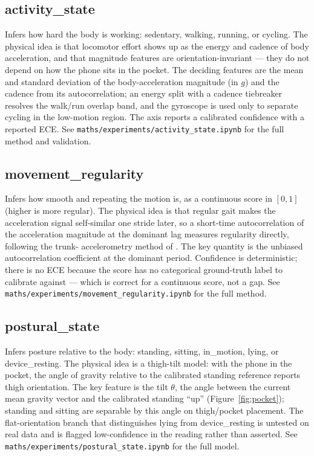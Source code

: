\documentclass[11pt]{article}
\newcommand{\nb}[1]{\texttt{#1}}            %
\begin{document}
\subsection{activity\_state}
Infers how hard the body is working: sedentary, walking, running, or cycling. The
physical idea is that locomotor effort shows up as the energy and cadence of body
acceleration, and that magnitude features are orientation-invariant --- they do not
depend on how the phone sits in the pocket. The deciding features are the mean and
standard deviation of the body-acceleration magnitude (in $g$) and the cadence from its
autocorrelation; an energy split with a cadence tiebreaker resolves the walk/run
overlap band, and the gyroscope is used only to separate cycling in the low-motion
region. The axis reports a calibrated confidence with a reported ECE. See
\nb{maths/experiments/activity\_state.ipynb} for the full method and validation.

\subsection{movement\_regularity}
Infers how smooth and repeating the motion is, as a continuous score in $[0,1]$ (higher
is more regular). The physical idea is that regular gait makes the acceleration signal
self-similar one stride later, so a short-time autocorrelation of the acceleration
magnitude at the dominant lag measures regularity directly, following the trunk-
accelerometry method of \citet{moenilssen2004gait}.
The key quantity is the unbiased autocorrelation coefficient at the dominant period.
Confidence is deterministic; there is no ECE because the score has no categorical
ground-truth label to calibrate against --- which is correct for a continuous score, not
a gap. See \nb{maths/experiments/movement\_regularity.ipynb} for the full method.

\subsection{postural\_state}
Infers posture relative to the body: standing, sitting, in\_motion, lying, or
device\_resting. The physical idea is a thigh-tilt model: with the phone in the pocket,
the angle of gravity relative to the calibrated standing reference reports thigh
orientation. The key feature is the tilt $\theta$, the angle between the current mean
gravity vector and the calibrated standing ``up'' (Figure~\ref{fig:pocket}); standing
and sitting are separable by this angle on thigh/pocket placement. The flat-orientation
branch that distinguishes lying from device\_resting is untested on real data and is
flagged low-confidence in the reading rather than asserted. See
\nb{maths/experiments/postural\_state.ipynb} for the full model.
\end{document}
